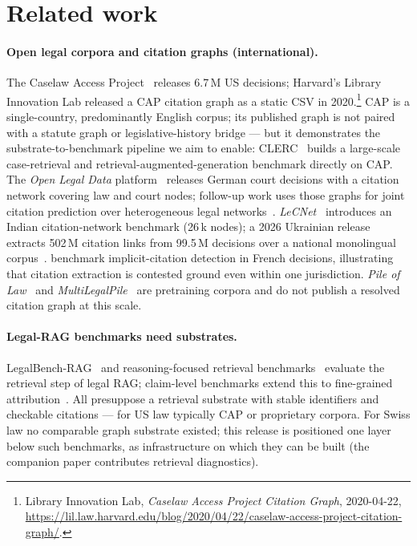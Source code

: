 \documentclass[11pt,a4paper]{article}
\begin{document}
\section{Related work}\label{sec:related}

\paragraph{Open legal corpora and citation graphs (international).} The Caselaw Access Project~\cite{cap2018} releases 6.7\,M US decisions; Harvard's Library Innovation Lab released a CAP citation graph as a static CSV in 2020.\footnote{Library Innovation Lab, \emph{Caselaw Access Project Citation Graph}, 2020-04-22, \url{https://lil.law.harvard.edu/blog/2020/04/22/caselaw-access-project-citation-graph/}.} CAP is a single-country, predominantly English corpus; its published graph is not paired with a statute graph or legislative-history bridge --- but it demonstrates the substrate-to-benchmark pipeline we aim to enable: CLERC~\citep{hou2024clerc} builds a large-scale case-retrieval and retrieval-augmented-generation benchmark directly on CAP. The \emph{Open Legal Data} platform~\cite{ostendorff2020} releases German court decisions with a citation network covering law and court nodes; follow-up work uses those graphs for joint citation prediction over heterogeneous legal networks~\citep{milz2025missinglink}. \emph{LeCNet}~\cite{lecnet2025} introduces an Indian citation-network benchmark (26\,k nodes); a 2026 Ukrainian release extracts 502\,M citation links from 99.5\,M decisions over a national monolingual corpus~\citep{ovcharov2026ukraine}. \citet{floro2026} benchmark implicit-citation detection in French decisions, illustrating that citation extraction is contested ground even within one jurisdiction. \emph{Pile of Law}~\cite{pile2022} and \emph{MultiLegalPile}~\cite{niklaus2023} are pretraining corpora and do not publish a resolved citation graph at this scale.

\paragraph{Legal-RAG benchmarks need substrates.} LegalBench-RAG~\citep{pipitone2024} and reasoning-focused retrieval benchmarks~\citep{zheng2025} evaluate the retrieval step of legal RAG; claim-level benchmarks extend this to fine-grained attribution~\citep{xu2026claim}. All presuppose a retrieval substrate with stable identifiers and checkable citations --- for US law typically CAP or proprietary corpora. For Swiss law no comparable graph substrate existed; this release is positioned one layer below such benchmarks, as infrastructure on which they can be built (the companion paper contributes retrieval diagnostics).
\end{document}
